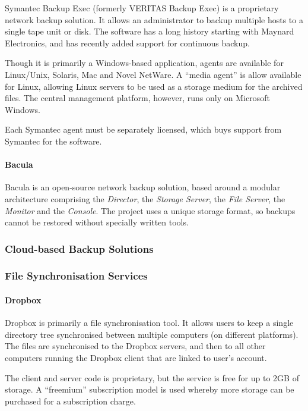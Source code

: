 Symantec Backup Exec (formerly VERITAS Backup Exec) is a proprietary network
backup solution. It allows an administrator to backup multiple hosts to
a single tape unit or disk. The software has a long history starting with
Maynard Electronics, and has recently added support for continuous backup.

Though it is primarily a Windows-based application, agents are available for
Linux/Unix, Solaris, Mac and Novel NetWare. A ``media agent'' is allow
available for Linux, allowing Linux servers to be used as a storage medium for
the archived files. The central management platform, however, runs only on
Microsoft Windows.

Each Symantec agent must be separately licensed, which buys support from
Symantec for the software.

\paragraph{Bacula}

Bacula is an open-source network backup solution, based around a modular
architecture comprising the \emph{Director}, the \emph{Storage Server}, the
\emph{File Server}, the \emph{Monitor} and the \emph{Console}. The project uses
a unique storage format, so backups cannot be restored without specially
written tools.

\subsubsection{Cloud-based Backup Solutions}

\subsubsection{File Synchronisation Services}

\paragraph{Dropbox}

Dropbox is primarily a file synchronisation tool. It allows users to keep
a single directory tree synchronised between multiple computers (on different
platforms). The files are synchronised to the Dropbox servers, and then to all
other computers running the Dropbox client that are linked to user's account.

The client and server code is proprietary, but the service is free for up to
2GB of storage. A ``freemium'' subscription model is used whereby more storage
can be purchased for a subscription charge.

